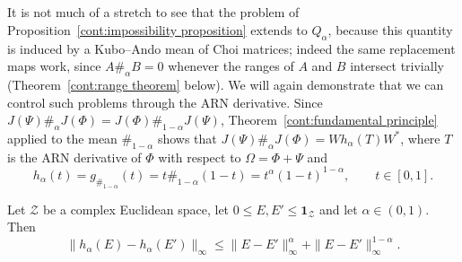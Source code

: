 It is not much of a stretch to see that the problem of Proposition~\ref{cont:impossibility proposition} extends to $\widehat{Q}_\alpha$, because this quantity is induced by a Kubo--Ando mean of Choi matrices; indeed the same replacement maps work, since $A\#_\alpha B=0$ whenever the ranges of $A$ and $B$ intersect trivially (Theorem~\ref{cont:range theorem} below). We will again demonstrate that we can control such problems through the ARN derivative. 
Since $J(\Psi)\#_\alpha J(\Phi)=J(\Phi)\#_{1-\alpha}J(\Psi)$, Theorem~\ref{cont:fundamental principle} applied to the mean $\#_{1-\alpha}$ shows that $J(\Psi)\#_\alpha J(\Phi)=Wh_\alpha(T)W^*$, where $T$ is the ARN derivative of $\Phi$ with respect to $\Omega=\Phi+\Psi$ and 
\begin{equation}\label{cont:eq:h alpha}
    h_\alpha(t)=g_{\#_{1-\alpha}}(t)=t\#_{1-\alpha}(1-t)=t^{\alpha}(1-t)^{1-\alpha},\qquad t\in[0,1].
\end{equation}
\begin{lemma}\label{cont:holder lemma}
    Let $\mathcal{Z}$ be a complex Euclidean space, let $0\leq E,E'\leq \mathbf{1}_{\mathcal{Z}}$ and let $\alpha\in (0,1)$. Then
    \[
        \|h_\alpha(E)-h_\alpha(E')\|_\infty\leq \|E-E'\|_\infty^\alpha+\|E-E'\|_\infty^{1-\alpha}.
    \]
\end{lemma}
